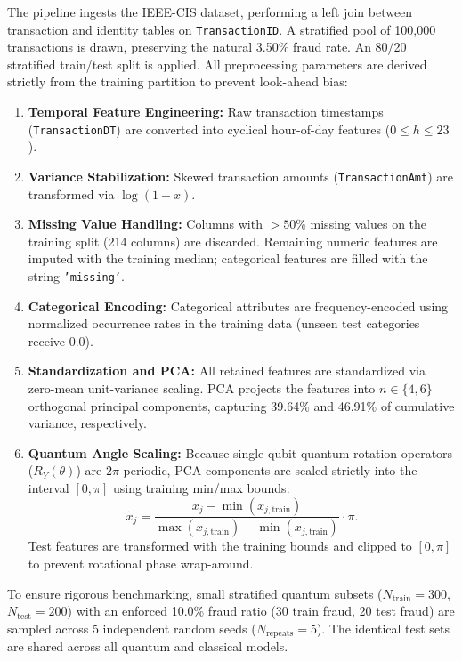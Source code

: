 \documentclass[12pt,a4paper]{article}
\begin{document}
The pipeline ingests the IEEE-CIS dataset, performing a left join between transaction and identity tables on \texttt{TransactionID}. A stratified pool of 100,000 transactions is drawn, preserving the natural 3.50\% fraud rate. An 80/20 stratified train/test split is applied. All preprocessing parameters are derived strictly from the training partition to prevent look-ahead bias:
\begin{enumerate}
    \item \textbf{Temporal Feature Engineering:} Raw transaction timestamps (\texttt{TransactionDT}) are converted into cyclical hour-of-day features ($0 \le h \le 23$).
    \item \textbf{Variance Stabilization:} Skewed transaction amounts (\texttt{TransactionAmt}) are transformed via $\log(1 + x)$.
    \item \textbf{Missing Value Handling:} Columns with $>50\%$ missing values on the training split (214 columns) are discarded. Remaining numeric features are imputed with the training median; categorical features are filled with the string \texttt{'missing'}.
    \item \textbf{Categorical Encoding:} Categorical attributes are frequency-encoded using normalized occurrence rates in the training data (unseen test categories receive $0.0$).
    \item \textbf{Standardization and PCA:} All retained features are standardized via zero-mean unit-variance scaling. PCA projects the features into $n \in \{4, 6\}$ orthogonal principal components, capturing 39.64\% and 46.91\% of cumulative variance, respectively.
    \item \textbf{Quantum Angle Scaling:} Because single-qubit quantum rotation operators ($R_Y(\theta)$) are $2\pi$-periodic, PCA components are scaled strictly into the interval $[0, \pi]$ using training min/max bounds:
    \begin{equation}
        \tilde{x}_j = \frac{x_j - \min(x_{j,\text{train}})}{\max(x_{j,\text{train}}) - \min(x_{j,\text{train}})} \cdot \pi.
    \end{equation}
    Test features are transformed with the training bounds and clipped to $[0, \pi]$ to prevent rotational phase wrap-around.
\end{enumerate}

To ensure rigorous benchmarking, small stratified quantum subsets ($N_{\text{train}} = 300$, $N_{\text{test}} = 200$) with an enforced 10.0\% fraud ratio (30 train fraud, 20 test fraud) are sampled across 5 independent random seeds ($N_{\text{repeats}} = 5$). The identical test sets are shared across all quantum and classical models.
\end{document}
